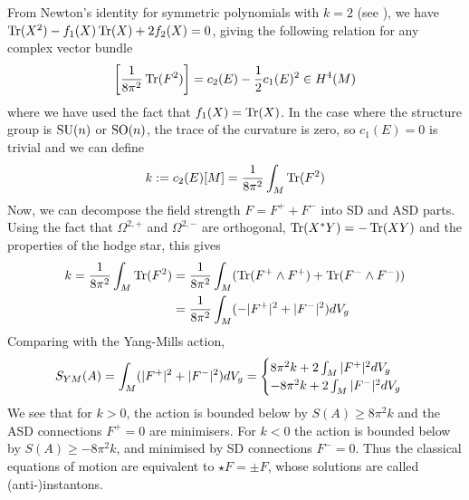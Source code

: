From Newton's identity for symmetric polynomials with $k=2$ 
(see \cite[Theorem B.2]{loringtu}), we have $\operatorname{Tr}(X^2)-f_1(X)\operatorname{Tr}(X)+2f_2(X)=0$, 
giving the following relation for any complex vector bundle
\[ %
	\bracket{\frac{1}{8\pi^2} \Tr(F^2)} = c_2(E) - \frac{1}{2}c_1(E)^2 \in H^4(M)
\] 
where we have used the fact that $f_1(X)=\operatorname{Tr}(X)$. 
In the case where the structure group is $\operatorname{SU}(n)$ or $\operatorname{SO}(n)$, the trace of the
curvature is zero, so $c_1(E)=0$ is trivial and we can define 
\begin{equation} \label{eq:k}
	k := c_2(E)[M] = \frac{1}{8\pi^2}\int_M \operatorname{Tr}(F^2)
\end{equation}
Now, we can
decompose the field strength $F = F^+ + F^-$ into SD and ASD 
parts. Using the fact that $\Omega^{2,+}$ and $\Omega^{2,-}$ are orthogonal, 
$\operatorname{Tr}(X^*Y) = -\operatorname{Tr}(XY)$ and the properties of the hodge star,
this gives 
\begin{align}
k
= \frac{1}{8\pi^2}\int_M\Tr(F^2) 
&= \frac{1}{8\pi^2}\int_M(\Tr(F^{+}\wedge  F^{+}) + \Tr(F^{-}\wedge F^{-}))
\nonumber \\
&= \frac{1}{8\pi^2}\int_M(-\abs[*]{F^+}^2 + \abs[*]{F^-}^2) dV_g 
\label{eq:second_chern}
\end{align}
Comparing with the Yang-Mills action, 
\begin{align*}
	S_{YM}(A) = \int_M (\abs[*]{F^+}^2+\abs[*]{F^-}^2) dV_g 
	= \begin{cases}
		8\pi^2 k + 2\int_M \abs[*]{F^+}^2 dV_g\\
		-8\pi^2 k + 2\int_M \abs[*]{F^-}^2 dV_g
	\end{cases}
\end{align*}
We see that for $k>0$, the action is bounded below by 
$S(A) \geq 8\pi^2k$ and the ASD connections $F^+=0$ are
minimisers. For $k<0$ the action is bounded
below by $S(A)\geq -8\pi^2k$, and minimised by SD connections
$F^-=0$. 
Thus the classical equations of motion are equivalent to $\star F = \pm F$,
whose solutions are called (anti-)instantons. 
